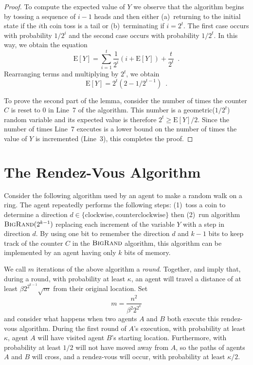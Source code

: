 \documentclass[lotsofwhite]{patmorin}
\newcommand{\bigrand}{\textsc{BigRand}}
\newcommand{\E}{\mathrm{E}}
\begin{document}
\begin{proof}
To compute the expected value of $Y$ we observe that the algorithm
begins by tossing a sequence of $i-1$ heads and then either
(a)~returning to the initial state if the $i$th coin toss is a tail
or (b)~terminating if $i=2^t$.  The first case occurs with probability
$1/2^i$ and the second case occurs with probability $1/2^t$.
In this way, we obtain the equation
\[
   \E[Y] = \sum_{i=1}^{t} \frac{1}{2^i}\left(i + \E[Y]\right) +
\frac{t}{2^t} \enspace .
\]
Rearranging terms and multiplying by $2^{t}$, we obtain
\[
   \E[Y] = 2^t(2-1/2^{t-1}) \enspace .  
\]

To prove the second part of the lemma, consider the number of times
the counter $C$ is reset to $0$ in Line~7 of the algorithm.  This
number is a geometric($1/2^t$) random variable and its expected value
is therefore $2^t \ge \E[Y]/2$.  Since the number of times Line~7
executes is a lower bound on the number of times the value of $Y$ is
incremented (Line~3), this completes the proof.
\end{proof}

\section{The Rendez-Vous Algorithm}

Consider the following algorithm used by an agent to make a random
walk on a ring.  The agent repeatedly performs the following steps:
(1)~toss a coin to determine a direction
$d\in\{\mbox{clockwise},\mbox{counterclockwise}\}$ then (2)~run
algorithm $\bigrand(2^{k-1})$ replacing each increment of the variable
$Y$ with a step in direction $d$. By using one bit to remember the
direction $d$ and $k-1$ bits to keep track of the counter $C$ in the
$\bigrand$ algorithm, this algorithm can be implemented by an agent
having only $k$ bits of memory.

We call $m$ iterations of the above algorithm a \emph{round}.
Together,  and  imply that, during a
round, with probability at least $\kappa$, an agent will travel a
distance of at least $\beta 2^{2^{k-1}}\sqrt{m}$ from their original
location.  Set
\[
   m= \frac{n^2}{\beta^2 2^{2^k}}  
\]
and consider what happens when two agents $A$ and $B$ both execute
this rendez-vous algorithm.  During the first round of $A$'s
execution, with probability at least $\kappa$, agent $A$ will have
visited agent $B$'s starting location. Furthermore, with probability
at least $1/2$ will not have moved away from $A$, so the paths of
agents $A$ and $B$ will cross, and a rendez-vous will occur, with
probability at least $\kappa/2$.
\end{document}
